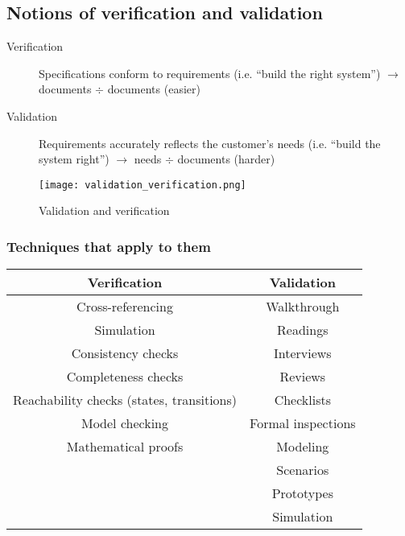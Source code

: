 \subsection{Notions of verification and validation}

\begin{description}
    \item[Verification] Specifications conform to requirements (i.e. \enquote{build the right system})
        \subitem{} $\rightarrow$ documents $\div$ documents (easier)
    \item[Validation] Requirements accurately reflects the customer's needs (i.e. \enquote{build the system right})
        \subitem{} $\rightarrow$ needs $\div$ documents (harder)
\end{description}

\begin{figure}[!ht]
    \centering
    \texttt{[image: validation\_verification.png]}
    \caption{Validation and verification}
\end{figure}

\subsubsection{Techniques that apply to them}

\begin{table}[!ht]
    \begin{center}
        \begin{tabular}{cc}
            \toprule
            Verification            & Validation \\
            \midrule
            Cross-referencing       & Walkthrough \\
            Simulation              & Readings \\
            Consistency checks      & Interviews \\
            Completeness checks     & Reviews \\
            Reachability checks (states, transitions) & Checklists \\
            Model checking          & Formal inspections \\
            Mathematical proofs     & Modeling \\
                                    & Scenarios \\
                                    & Prototypes \\
                                    & Simulation \\
            \bottomrule
        \end{tabular}
    \end{center}
\end{table}

